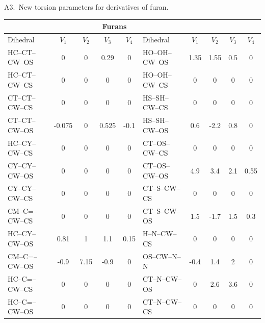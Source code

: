 \documentclass[12pt]{report}
\begin{document}
\newpage
\noindent A3.\ New torsion parameters for derivatives of furan.
\begin{table}[ht]
\footnotesize
\begin{tabular}{lcccc|lcccc}
\toprule
\multicolumn{8}{c}{\hspace*{2.2cm}Furans} \\
\midrule
Dihedral & $V_1$ & $V_2$ & $V_3$ & $V_4$ & Dihedral & $V_1$ & $V_2$ & $V_3$ & $V_4$\\
\midrule
HC--CT--CW--OS& 0&      0&      0.29&   0&      HO--OH--CW--OS& 1.35&   1.55&   0.5&    0\\
HC--CT--CW--CS& 0&      0&      0&      0&      HO--OH--CW--CS& 0&      0&      0&      0\\
CT--CT--CW--CS& 0&      0&      0&      0&      HS--SH--CW--CS& 0&      0&      0&      0\\ 
CT--CT--CW--OS& -0.075& 0&      0.525&  -0.1&   HS--SH--CW--OS& 0.6&    -2.2&   0.8&    0\\   
HC--CY--CW--CS& 0&      0&      0&      0&      CT--OS--CW--CS& 0&      0&      0&      0\\
CY--CY--CW--OS& 0&      0&      0&      0&      CT--OS--CW--OS& 4.9&    3.4&    2.1&    0.55\\    
CY--CY--CW--CS& 0&      0&      0&      0&      CT--S--CW--CS&  0&      0&      0&      0\\
CM--C=--CW--CS& 0&      0&      0&      0&      CT--S--CW--OS&  1.5&    -1.7&   1.5&    0.3\\
HC--CY--CW--OS& 0.81&   1&      1.1&    0.15&   H--N--CW--CS&   0&      0&      0&      0\\
CM--C=--CW--OS& -0.9&   7.15&   -0.9&   0&      OS--CW--N--N&   -0.4&   1.4&    2&      0\\
HC--C=--CW--CS& 0&      0&      0&      0&      CT--N--CW--OS&  0&      2.6&    3.6&    0\\
HC--C=--CW--OS& 0&      0&      0&      0&      CT--N--CW--CS&  0&      0&      0&      0\\
\bottomrule
\end{tabular}
\end{table}
\end{document}
